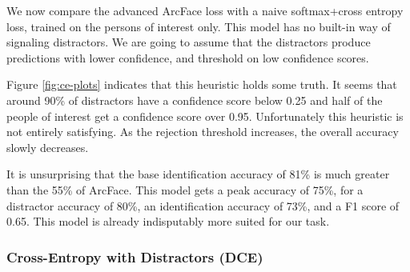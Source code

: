 We now compare the advanced ArcFace loss with a naive softmax+cross entropy loss, trained on the persons of interest only. This model has no built-in way of signaling distractors. We are going to assume that the distractors produce predictions with lower confidence, and threshold on low confidence scores.

Figure \ref{fig:ce-plots} indicates that this heuristic holds some truth. It seems that around 90\% of distractors have a confidence score below 0.25 and half of the people of interest get a confidence score over 0.95. Unfortunately this heuristic is not entirely satisfying. As the rejection threshold increases, the overall accuracy slowly decreases.

It is unsurprising that the base identification accuracy of 81\% is much greater than the 55\% of ArcFace. This model gets a peak accuracy of 75\%, for a distractor accuracy of 80\%, an identification accuracy of 73\%, and a F1 score of 0.65. This model is already indisputably more suited for our task.

\subsubsection{Cross-Entropy with Distractors (DCE)}


